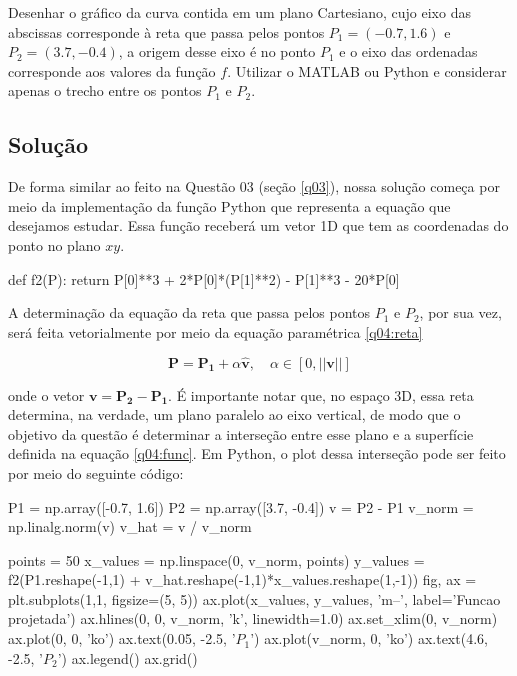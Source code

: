 \documentclass[10pt, a4paper]{article}
\begin{document}
Desenhar o gráfico da curva contida em um plano Cartesiano, 
cujo eixo das abscissas corresponde à reta que passa pelos pontos 
$P_1 = (-0.7, 1.6)$ e $P_2 = (3.7,-0.4)$, a origem desse eixo é no 
ponto $P_1$ e o eixo das ordenadas corresponde aos valores da função $f$. 
Utilizar o MATLAB ou Python e considerar apenas o trecho entre os pontos 
$P_1$ e $P_2$.

\subsection[q04:solucao]{Solução}

De forma similar ao feito na Questão 03 (seção \ref{q03}), nossa solução começa por meio da
implementação da função Python que representa a equação que desejamos estudar. Essa função receberá
um vetor 1D que tem as coordenadas do ponto no plano $xy$.

\begin{python}
def f2(P):
    return P[0]**3 + 2*P[0]*(P[1]**2) - P[1]**3 - 20*P[0]
\end{python}

A determinação da equação da reta que passa pelos pontos $P_1$ e $P_2$, por sua vez, será feita
vetorialmente por meio da equação paramétrica \cref{q04:reta}

\begin{equation}\label{q04:reta}
  \mathbf{P} = \mathbf{P_1} + \alpha\mathbf{\hat{v}}, \quad \alpha \in \left[0, ||\mathbf{v}||\right]
\end{equation}

onde o vetor $\mathbf{v} = \mathbf{P_2} - \mathbf{P_1}$. É importante notar que, 
no espaço 3D, essa reta determina, na verdade, um plano paralelo ao eixo vertical,
de modo que o objetivo da questão é determinar a interseção entre esse plano e a superfície
definida na equação \cref{q04:func}. Em Python, o plot dessa interseção pode ser feito
por meio do seguinte código:
\begin{python}
P1 = np.array([-0.7, 1.6])
P2 = np.array([3.7, -0.4])
v = P2 - P1
v_norm = np.linalg.norm(v)
v_hat  = v / v_norm

points = 50
x_values = np.linspace(0, v_norm, points)
y_values = f2(P1.reshape(-1,1) + v_hat.reshape(-1,1)*x_values.reshape(1,-1))
fig, ax = plt.subplots(1,1, figsize=(5, 5))
ax.plot(x_values, y_values, 'm--', label='Funcao projetada')
ax.hlines(0, 0, v_norm, 'k', linewidth=1.0)
ax.set_xlim(0, v_norm)
ax.plot(0, 0, 'ko')
ax.text(0.05, -2.5, '$P_1$')
ax.plot(v_norm, 0, 'ko')
ax.text(4.6, -2.5, '$P_2$')
ax.legend()
ax.grid()
\end{python}
\end{document}
